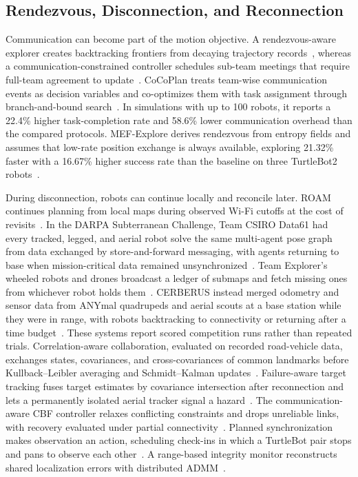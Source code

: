 \subsection{Rendezvous, Disconnection, and Reconnection}

Communication can become part of the motion objective. A rendezvous-aware explorer creates backtracking frontiers from decaying trajectory records~\cite{P_E38}, whereas a communication-constrained controller schedules sub-team meetings that require full-team agreement to update~\cite{P_E39}. CoCoPlan treats team-wise communication events as decision variables and co-optimizes them with task assignment through branch-and-bound search~\cite{P_R19}. In simulations with up to 100 robots, it reports a 22.4\% higher task-completion rate and 58.6\% lower communication overhead than the compared protocols. MEF-Explore derives rendezvous from entropy fields and assumes that low-rate position exchange is always available, exploring 21.32\% faster with a 16.67\% higher success rate than the baseline on three TurtleBot2 robots~\cite{P_R24}.

During disconnection, robots can continue locally and reconcile later. ROAM continues planning from local maps during observed Wi-Fi cutoffs at the cost of revisits~\cite{P_X08}. In the DARPA Subterranean Challenge, Team CSIRO Data61 had every tracked, legged, and aerial robot solve the same multi-agent pose graph from data exchanged by store-and-forward messaging, with agents returning to base when mission-critical data remained unsynchronized~\cite{P_K08}. Team Explorer's wheeled robots and drones broadcast a ledger of submaps and fetch missing ones from whichever robot holds them~\cite{P_K09}. CERBERUS instead merged odometry and sensor data from ANYmal quadrupeds and aerial scouts at a base station while they were in range, with robots backtracking to connectivity or returning after a time budget~\cite{P_K10}. These systems report scored competition runs rather than repeated trials. Correlation-aware collaboration, evaluated on recorded road-vehicle data, exchanges states, covariances, and cross-covariances of common landmarks before Kullback--Leibler averaging and Schmidt--Kalman updates~\cite{P_F03}. Failure-aware target tracking fuses target estimates by covariance intersection after reconnection and lets a permanently isolated aerial tracker signal a hazard~\cite{P_F12}. The communication-aware CBF controller relaxes conflicting constraints and drops unreliable links, with recovery evaluated under partial connectivity~\cite{P_F13}. Planned synchronization makes observation an action, scheduling check-ins in which a TurtleBot pair stops and pans to observe each other~\cite{P_S25}. A range-based integrity monitor reconstructs shared localization errors with distributed ADMM~\cite{P_N11}.


